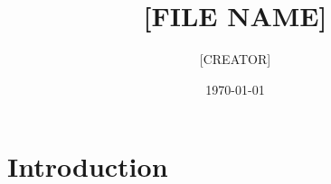 \documentclass{article}
\title{[FILE NAME]}
\author{[CREATOR]}
\date{\today} %
\begin{document}
\maketitle

\section{Introduction}

\end{document}

